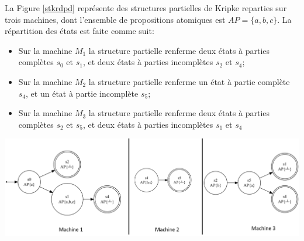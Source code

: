 La Figure \ref{stkrdpd} représente des structures partielles de Kripke reparties sur trois machines, dont l'ensemble de propositions atomiques est ${\displaystyle AP=\{a,b,c\}}$. La répartition des états est faite comme suit:  
\begin{itemize}
 \item Sur la machine $M_1$ la structure partielle renferme deux états à parties complètes $s_0$ et $s_1$, et deux états à parties incomplètes $s_2$ et $s_4$;
 \item Sur la machine $M_2$ la structure partielle renferme un état à partie complète $s_4$, et un état à partie incomplète $s_5$;
 \item Sur la machine $M_3$ la structure partielle renferme deux  états à parties complètes $s_2$ et $s_5$, et deux états à parties incomplètes $s_1$ et $s_4$
 \end{itemize}

\begin{center}
	\includegraphics[scale=0.7]{img/stkd.png}
	 \label{stkrdpd}
 \end{center}